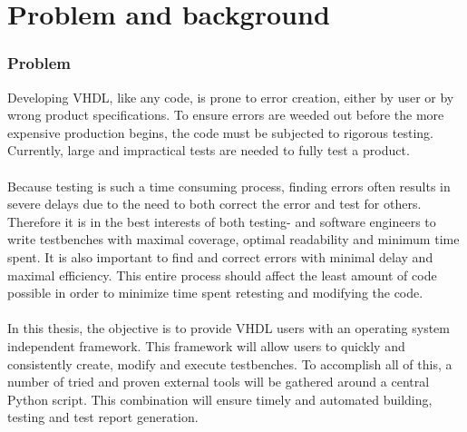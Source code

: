 \documentclass[11pt,british]{article}
\begin{document}
\printglossary[type=\acronymtype,title={List of Acronyms}]
\pagebreak

\part{Problem and background}
\renewcommand{\thepage}{\arabic{page}}
\setcounter{page}{1}


\section{Problem}

Developing \gls{VHDL}, like any code, is prone to error creation, either by user or by wrong product specifications. To ensure errors are weeded out before the more expensive production begins, the code must be subjected to rigorous testing. Currently, large and impractical tests are needed to fully test a product.
\\
\\
Because testing is such a time consuming process, finding errors often results in severe delays due to the need to both correct the error and test for others. Therefore it is in the best interests of both testing- and software engineers to write testbenches with maximal coverage, optimal readability and minimum time spent. It is also important to find and correct errors with minimal delay and maximal efficiency. This entire process should affect the least amount of code possible in order to minimize time spent retesting and modifying the code.
\\
\\
In this thesis, the objective is to provide VHDL users with an operating system independent framework. This framework will allow users to quickly and consistently create, modify and execute testbenches. To accomplish all of this, a number of tried and proven external tools will be gathered around a central Python script. This combination will ensure timely and automated building, testing and test report generation.

\end{document}
